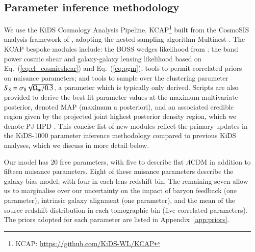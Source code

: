 \subsection{Parameter inference methodology}
\label{sec:KCAP}
We use the KiDS Cosmology Analysis Pipeline, {\sc KCAP}\footnote{{\sc KCAP}: \url{https://github.com/KiDS-WL/KCAP}} built from the {\sc CosmoSIS} analysis framework of \citet{zuntz/etal:2015}, adopting the nested sampling algorithm {\sc Multinest} \citep{feroz/hobson:2008,feroz/etal:2009,feroz/etal:2019}.  The {\sc KCAP} bespoke modules include: the BOSS wedges likelihood from \citet{sanchez/etal:2017}; the band power cosmic shear and galaxy-galaxy lensing likelihood based on Eq.~(\ref{eq:cl_cosmicshear}) and Eq.~(\ref{eq:pgm});  tools to permit correlated priors on nuisance parameters; and tools to sample over the clustering parameter $S_8= \sigma_8 \sqrt{\Omega_{\rm m}/0.3}$, a parameter which is typically only derived.  Scripts are also provided to derive the best-fit parameter values at the maximum multivariate posterior, denoted MAP (maximum a posteriori), and an associated credible region given by the projected joint highest posterior density region, which we denote PJ-HPD \citep{joachimi/etal:inprep}.  This concise list of new modules reflect the primary updates in the KiDS-1000 parameter inference methodology compared to previous KiDS analyses, which we discuss in more detail below.

Our \tttp model has 20 free parameters, with five to describe flat $\Lambda$CDM in addition to fifteen nuisance parameters.   Eight of these nuisance parameters describe the galaxy bias model, with four in each lens redshift bin. The remaining seven allow us to marginalise over our uncertainty on the impact of baryon feedback (one parameter), intrinsic galaxy alignment (one parameter), and the mean of the source redshift distribution in each tomographic bin (five correlated parameters).   The priors adopted for each parameter are listed in Appendix~\ref{app:priors}.  

